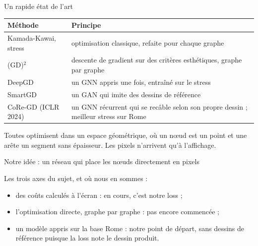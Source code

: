 \documentclass[aspectratio=169,11pt]{beamer}
\begin{document}
\begin{frame}{Un rapide état de l'art}
\small
\begin{tabularx}{\textwidth}{@{}l X@{}}
\toprule
\textbf{Méthode} & \textbf{Principe} \\
\midrule
Kamada-Kawai, stress & optimisation classique, refaite pour chaque graphe \\
(GD)$^2$ & descente de gradient sur des critères esthétiques, graphe par graphe \\
DeepGD & un GNN appris une fois, entraîné sur le stress \\
SmartGD & un GAN qui imite des dessins de référence \\
CoRe-GD (ICLR 2024) & un GNN récurrent qui se recâble selon son propre dessin ; meilleur stress sur Rome \\
\bottomrule
\end{tabularx}

\vspace{0.5cm}
\textcolor{gris}{Toutes optimisent dans un espace géométrique, où un nœud est un point et une arête un segment sans épaisseur. Les pixels n'arrivent qu'à l'affichage.}
\end{frame}

\begin{frame}{Notre idée : un réseau qui place les nœuds directement en pixels}
\centering
{}

\vspace{0.6cm}
\begin{minipage}{0.86\textwidth}
\small Les trois axes du sujet, et où nous en sommes :
\begin{itemize}
\setlength{\itemsep}{2pt}
\item des coûts calculés à l'écran : en cours, c'est notre loss ;
\item l'optimisation directe, graphe par graphe : pas encore commencée ;
\item un modèle appris sur la base Rome : notre point de départ, sans dessins de référence puisque la loss note le dessin produit.
\end{itemize}
\end{minipage}
\end{frame}
\end{document}
